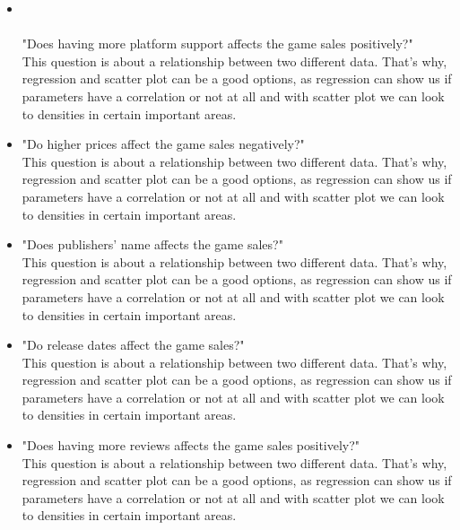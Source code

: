 \documentclass[conference]{IEEEtran}
\begin{document}
\begin{itemize}
    \item \\\\"Does having more platform support affects the game sales positively?" \\ This question is about a relationship between two different data. That's why, regression and scatter plot can be a good options, as regression can show us if parameters have a correlation or not at all and with scatter plot we can look to densities in certain important areas.\\
    \item "Do higher prices affect the game sales negatively?" \\ This question is about a relationship between two different data. That's why, regression and scatter plot can be a good options, as regression can show us if parameters have a correlation or not at all and with scatter plot we can look to densities in certain important areas.\\
    \item "Does publishers' name affects the game sales?" \\ This question is about a relationship between two different data. That's why, regression and scatter plot can be a good options, as regression can show us if parameters have a correlation or not at all and with scatter plot we can look to densities in certain important areas.\\
    \item "Do release dates affect the game sales?" \\ This question is about a relationship between two different data. That's why, regression and scatter plot can be a good options, as regression can show us if parameters have a correlation or not at all and with scatter plot we can look to densities in certain important areas.\\
    \item "Does having more reviews affects the game sales positively?" \\ This question is about a relationship between two different data. That's why, regression and scatter plot can be a good options, as regression can show us if parameters have a correlation or not at all and with scatter plot we can look to densities in certain important areas.\\
\end{itemize}
\end{document}
